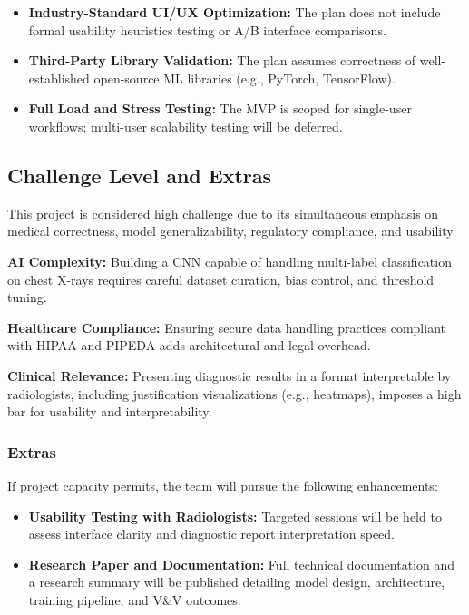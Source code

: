 \documentclass[12pt, titlepage]{article}
\begin{document}
\begin{itemize}
  \item \textbf{Industry-Standard UI/UX Optimization:} The plan does not include formal usability heuristics testing or A/B interface comparisons.
  \item \textbf{Third-Party Library Validation:} The plan assumes correctness of well-established open-source ML libraries (e.g., PyTorch, TensorFlow).
  \item \textbf{Full Load and Stress Testing:} The MVP is scoped for single-user workflows; multi-user scalability testing will be deferred.
\end{itemize}

\subsection{Challenge Level and Extras}
This project is considered high challenge due to its simultaneous emphasis on medical correctness, model generalizability, regulatory compliance, and usability.

\textbf{AI Complexity:} Building a CNN capable of handling multi-label classification on chest X-rays requires careful dataset curation, bias control, and threshold tuning.

\textbf{Healthcare Compliance:} Ensuring secure data handling practices compliant with HIPAA and PIPEDA adds architectural and legal overhead.

\textbf{Clinical Relevance:} Presenting diagnostic results in a format interpretable by radiologists, including justification visualizations (e.g., heatmaps), imposes a high bar for usability and interpretability.

\subsubsection{Extras}
If project capacity permits, the team will pursue the following enhancements:

\begin{itemize}
  \item \textbf{Usability Testing with Radiologists:} Targeted sessions will be held to assess interface clarity and diagnostic report interpretation speed.
  \item \textbf{Research Paper and Documentation:} Full technical documentation and a research summary will be published detailing model design, architecture, training pipeline, and V\&V outcomes.
\end{itemize}
\end{document}
